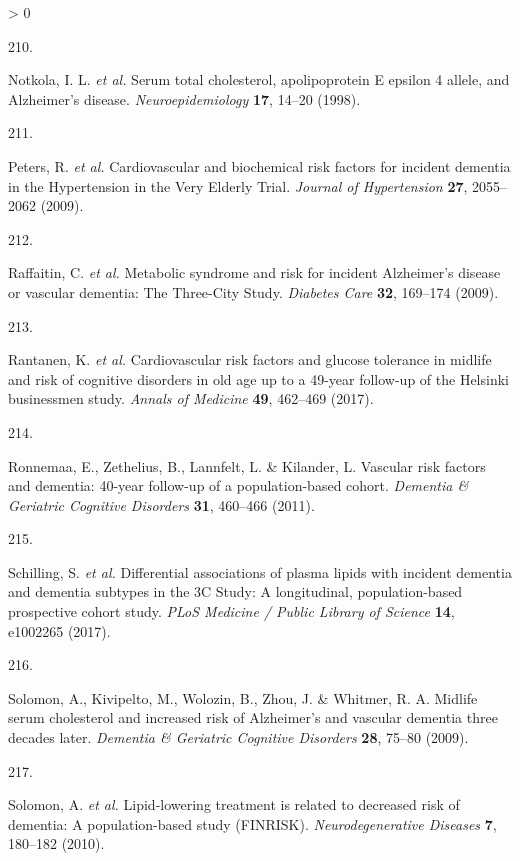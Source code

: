 \documentclass[a4paper, twoside]{templates/ociamthesis}
\newlength{\cslhangindent}
\newlength{\csllabelwidth}
\newenvironment{CSLReferences}[3] %
 {%
  \setlength{\parindent}{0pt}
  \ifodd #1 \everypar{\setlength{\hangindent}{\cslhangindent}}\ignorespaces\fi
  \ifnum #2 > 0
  \setlength{\parskip}{#2\baselineskip}
  \fi
 }%
 {}
\newcommand{\CSLLeftMargin}[1]{\parbox[t]{\maxof{\widthof{#1}}{\csllabelwidth}}{#1}}
\newcommand{\CSLRightInline}[1]{\parbox[t]{\linewidth - \csllabelwidth}{#1}}
\begin{document}
\begin{CSLReferences}{0}{0}
\leavevmode\hypertarget{ref-notkola1998}{}%
\CSLLeftMargin{210. }
\CSLRightInline{Notkola, I. L. \emph{et al.} Serum total cholesterol, apolipoprotein {E} epsilon 4 allele, and {Alzheimer}'s disease. \emph{Neuroepidemiology} \textbf{17}, 14--20 (1998).}

\leavevmode\hypertarget{ref-peters2009}{}%
\CSLLeftMargin{211. }
\CSLRightInline{Peters, R. \emph{et al.} Cardiovascular and biochemical risk factors for incident dementia in the {Hypertension} in the {Very Elderly Trial}. \emph{Journal of Hypertension} \textbf{27}, 2055--2062 (2009).}

\leavevmode\hypertarget{ref-raffaitin2009}{}%
\CSLLeftMargin{212. }
\CSLRightInline{Raffaitin, C. \emph{et al.} Metabolic syndrome and risk for incident {Alzheimer}'s disease or vascular dementia: The {Three}-{City Study}. \emph{Diabetes Care} \textbf{32}, 169--174 (2009).}

\leavevmode\hypertarget{ref-rantanen2017}{}%
\CSLLeftMargin{213. }
\CSLRightInline{Rantanen, K. \emph{et al.} Cardiovascular risk factors and glucose tolerance in midlife and risk of cognitive disorders in old age up to a 49-year follow-up of the {Helsinki} businessmen study. \emph{Annals of Medicine} \textbf{49}, 462--469 (2017).}

\leavevmode\hypertarget{ref-ronnemaa2011}{}%
\CSLLeftMargin{214. }
\CSLRightInline{Ronnemaa, E., Zethelius, B., Lannfelt, L. \& Kilander, L. Vascular risk factors and dementia: 40-year follow-up of a population-based cohort. \emph{Dementia \& Geriatric Cognitive Disorders} \textbf{31}, 460--466 (2011).}

\leavevmode\hypertarget{ref-schilling2017a}{}%
\CSLLeftMargin{215. }
\CSLRightInline{Schilling, S. \emph{et al.} Differential associations of plasma lipids with incident dementia and dementia subtypes in the {3C Study}: A longitudinal, population-based prospective cohort study. \emph{PLoS Medicine / Public Library of Science} \textbf{14}, e1002265 (2017).}

\leavevmode\hypertarget{ref-solomon2009a}{}%
\CSLLeftMargin{216. }
\CSLRightInline{Solomon, A., Kivipelto, M., Wolozin, B., Zhou, J. \& Whitmer, R. A. Midlife serum cholesterol and increased risk of {Alzheimer}'s and vascular dementia three decades later. \emph{Dementia \& Geriatric Cognitive Disorders} \textbf{28}, 75--80 (2009).}

\leavevmode\hypertarget{ref-solomon2010}{}%
\CSLLeftMargin{217. }
\CSLRightInline{Solomon, A. \emph{et al.} Lipid-lowering treatment is related to decreased risk of dementia: A population-based study ({FINRISK}). \emph{Neurodegenerative Diseases} \textbf{7}, 180--182 (2010).}


\end{CSLReferences}
\end{document}
